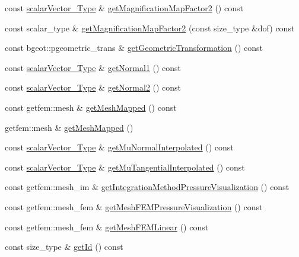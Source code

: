 \begin{DoxyCompactItemize}
const \hyperlink{Core_8h_a4e75b5863535ba1dd79942de2846eff0}{scalar\-Vector\-\_\-\-Type} \& \hyperlink{classFractureHandler_a68b09b4012669140979a0026736b3dfe}{get\-Magnification\-Map\-Factor2} () const 
\item 
const scalar\-\_\-type \& \hyperlink{classFractureHandler_a5bbe076a3595909f6af49e8d69e39231}{get\-Magnification\-Map\-Factor2} (const size\-\_\-type \&dof) const 
\item 
const bgeot\-::pgeometric\-\_\-trans \& \hyperlink{classFractureHandler_a2e1d27efecfa84246375be5f4262bab2}{get\-Geometric\-Transformation} () const 
\item 
const \hyperlink{Core_8h_a4e75b5863535ba1dd79942de2846eff0}{scalar\-Vector\-\_\-\-Type} \& \hyperlink{classFractureHandler_a22e229a4016119138c48b456a185e1ff}{get\-Normal1} () const 
\item 
const \hyperlink{Core_8h_a4e75b5863535ba1dd79942de2846eff0}{scalar\-Vector\-\_\-\-Type} \& \hyperlink{classFractureHandler_ae707e764eaff191e2856765131289c82}{get\-Normal2} () const 
\item 
const getfem\-::mesh \& \hyperlink{classFractureHandler_a79b2fbb306b2bc045d5bef0b73d12ec8}{get\-Mesh\-Mapped} () const 
\item 
getfem\-::mesh \& \hyperlink{classFractureHandler_ad3fa0255b0e57f6562dc98bbf71588b1}{get\-Mesh\-Mapped} ()
\item 
const \hyperlink{Core_8h_a4e75b5863535ba1dd79942de2846eff0}{scalar\-Vector\-\_\-\-Type} \& \hyperlink{classFractureHandler_a6af2b5af4046d6a0eafbacaec96f8153}{get\-Mu\-Normal\-Interpolated} () const 
\item 
const \hyperlink{Core_8h_a4e75b5863535ba1dd79942de2846eff0}{scalar\-Vector\-\_\-\-Type} \& \hyperlink{classFractureHandler_a868f8aeaeec90df8211d091612e03593}{get\-Mu\-Tangential\-Interpolated} () const 
\item 
const getfem\-::mesh\-\_\-im \& \hyperlink{classFractureHandler_a157f39f66131faf579b980b6b5fb91fb}{get\-Integration\-Method\-Pressure\-Visualization} () const 
\item 
const getfem\-::mesh\-\_\-fem \& \hyperlink{classFractureHandler_ac78f500422e542b77114e56f11173b0d}{get\-Mesh\-F\-E\-M\-Pressure\-Visualization} () const 
\item 
const getfem\-::mesh\-\_\-fem \& \hyperlink{classFractureHandler_ab77ee6aaf47d7f1d80fd1ff23bd34a33}{get\-Mesh\-F\-E\-M\-Linear} () const 
\item 
const size\-\_\-type \& \hyperlink{classFractureHandler_a7f7ec5b15315791f76d8deb0874511d6}{get\-Id} () const 

\end{DoxyCompactItemize}
